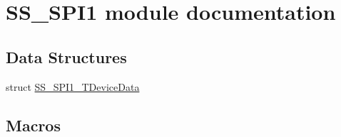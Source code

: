 \hypertarget{group___s_s___s_p_i1__module}{\section{S\-S\-\_\-\-S\-P\-I1 module documentation}
\label{group___s_s___s_p_i1__module}
}
\subsection*{Data Structures}
\begin{DoxyCompactItemize}
\item 
struct \hyperlink{struct_s_s___s_p_i1___t_device_data}{S\-S\-\_\-\-S\-P\-I1\-\_\-\-T\-Device\-Data}
\end{DoxyCompactItemize}
\subsection*{Macros}
